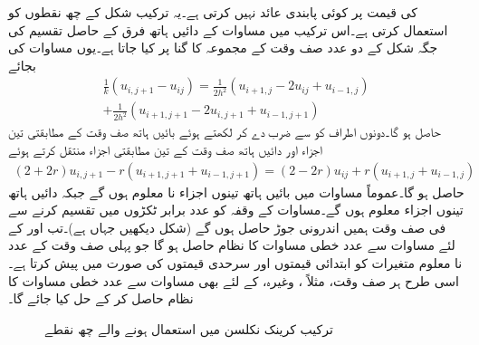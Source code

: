  کی قیمت پر   کوئی پابندی عائد نہیں کرتی ہے۔یہ ترکیب شکل  کے چھ نقطوں کو استعمال کرتی ہے۔اس ترکیب میں مساوات  کے دائیں ہاتھ فرق کے حاصل تقسیم کی جگہ شکل  کے دو عدد صف  وقت کے مجموعہ کا  گنا  پر کیا جاتا ہے۔یوں مساوات  کی بجائے
\begin{multline}
\frac{1}{k}(u_{i,j+1}-u_{ij})=\frac{1}{2h^2}(u_{i+1,j}-2u_{ij}+u_{i-1,j})\\
+\frac{1}{2h^2}(u_{i+1,j+1}-2u_{i,j+1}+u_{i-1,j+1})
\end{multline}
حاصل ہو گا۔دونوں اطراف کو  سے ضرب دے کر  لکھتے ہوئے بائیں ہاتھ صف وقت  کے مطابقتی تین اجزاء اور دائیں ہاتھ صف وقت  کے تین مطابقتی اجزاء منتقل کرتے ہوئے
\begin{align}\label{مساوات_اعدادی_کرینک_نکلسن_الف}
(2+2r)u_{i,j+1}-r(u_{i+1,j+1}+u_{i-1,j+1})=(2-2r)u_{ij}+r(u_{i+1,j}+u_{i-1,j})
\end{align}
حاصل ہو گا۔عموماً مساوات  میں بائیں ہاتھ تینوں اجزاء نا معلوم ہوں گے جبکہ دائیں ہاتھ تینوں اجزاء معلوم ہوں گے۔مساوات  کے وقفہ  کو  عدد برابر ٹکڑوں میں تقسیم کرنے سے فی صف وقت ہمیں  اندرونی جوڑ حاصل ہوں گے (شکل  دیکھیں جہاں  ہے)۔تب  اور  کے لئے  مساوات  سے   عدد خطی مساوات کا نظام  حاصل ہو گا جو پہلی صف وقت کے  عدد نا معلوم متغیرات  کو  ابتدائی قیمتوں  اور سرحدی قیمتوں  کی صورت میں پیش کرتا ہے۔ اسی طرح ہر صف وقت، مثلاً ،  وغیرہ، کے لئے بھی مساوات  سے   عدد خطی مساوات کا نظام حاصل کر کے   حل کیا جائے گا۔ 
\begin{figure}
\centering
{}
\caption{ترکیب کرینک نکلسن میں استعمال ہونے والے چھ نقطے}
\label{شکل_اعدادی_ترکیب_کرینک_نکلسن}
\end{figure}

